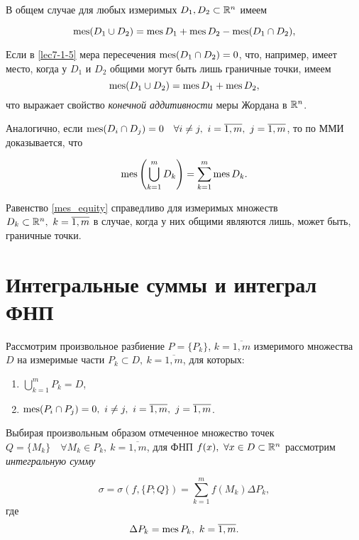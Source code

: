 \documentclass[../../main.tex]{subfiles}
\begin{document}
В общем случае для любых измеримых $D_1, D_2 \subset \mathbb{R}^n$ имеем

\begin{equation}
\label{lec7-1-5}
\operatorname{mes} (D_1 \cup D_2) = \operatorname{mes} D_1 + \operatorname{mes} D_2 - \operatorname{mes}(D_1 \cap D_2),
\end{equation}

Если в \eqref{lec7-1-5} мера пересечения $\operatorname{mes}(D_1 \cap 
D_2) = 0$, что, например, имеет место, когда у $D_1$ и 
$D_2$ общими могут быть лишь граничные точки, имеем
\[
	\operatorname{mes}(D_1 \cup D_2) = \operatorname{mes} D_1 + \operatorname{mes} D_2,
\]
что выражает свойство \emph{конечной аддитивности} меры Жордана в $\mathbb{R}^n$.

Аналогично, если $\operatorname{mes}(D_i \cap D_j) = 0\quad 
\forall i \ne j,\ i = \overline{1,m},\ j = \overline{1,m}$, 
то по ММИ доказывается, что

\begin{equation}
\label{mes_equity}
\operatorname{mes}\left(\bigcup_{k=1}^m D_k \right) = \sum_{k=1}^{m} \operatorname{mes} D_k.
\end{equation}

Равенство \eqref{mes_equity} справедливо для измеримых множеств 
$D_k \subset \mathbb{R}^n,\ k = \overline{1,m}$ в случае, 
когда у них общими являются лишь, может быть, граничные точки.

\section{Интегральные суммы и интеграл ФНП}

Рассмотрим произвольное разбиение $P = \{P_k\}$, ${k = 
\overline{1, m}}$ измеримого множества $D$
на измеримые части $P_k \subset D,\ k = 
\overline{1, m}$, для которых:

\begin{enumerate}
	\item $\bigcup\limits_{k = 1}^m P_k = D$,
	\item $\operatorname{mes}(P_i \cap P_j) = 0,\ i \neq j,\ i = 
	\overline{1, m},\ j = \overline{1, m}$.
\end{enumerate}

Выбирая произвольным образом отмеченное множество точек 
$Q = \{M_k\}\quad \forall M_k \in P_k,\ k = \overline{1, m}$,
для ФНП $f(x),\ \forall x \in D \subset \mathbb{R}^n $ 
рассмотрим \emph{интегральную сумму}

\begin{equation}
\sigma = \sigma(f, \{P; Q\}) = \sum\limits_{k = 1}^mf(M_k)\Delta{P_k},
\end{equation}
где \[\Delta{P_k} = \operatorname{mes} P_k,\ k = \overline{1, m}.\]
\end{document}
